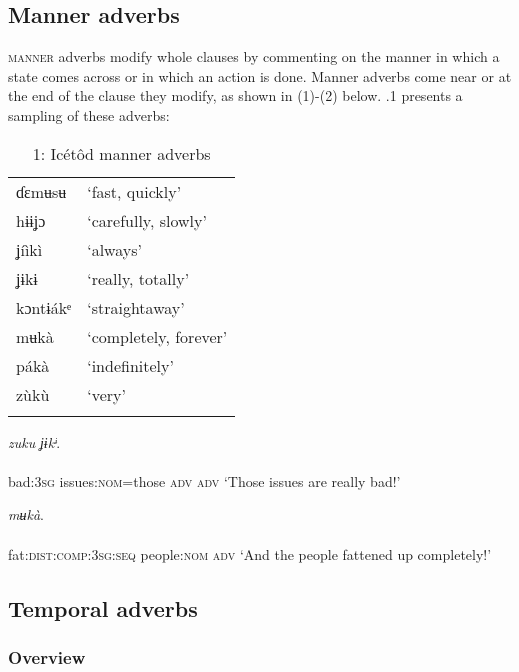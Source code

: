 \subsection{Manner adverbs}


\textsc{manner} adverbs modify whole clauses by commenting on the manner in which a state comes across or in which an action is done. Manner adverbs come near or at the end of the clause they modify, as shown in (1)-(2) below. .1 presents a sampling of these adverbs:


\begin{table}
\caption{1: Icétôd manner adverbs}
\label{tab:9}


\begin{tabularx}{\textwidth}{XX}
\lsptoprule

ɗɛmʉsʉ & ‘fast, quickly’\\
hɨɨʝɔ & ‘carefully, slowly’\\
ʝíìkì & ‘always’\\
ʝɨkɨ & ‘really, totally’\\
kɔntɨákᵉ & ‘straightaway’\\
mʉkà & ‘completely, forever’\\
pákà & ‘indefinitely’\\
zùkù & ‘very’\\
\lspbottomrule
\end{tabularx}
\end{table}



\ea\label{ex:}
     \textit{zuku}\textit{}   \textit{ʝɨkᶤ}. \\
    \\
bad:\textsc{3sg}   issues:\textsc{nom}=those   \textsc{adv   adv}
\glt ‘Those issues are really bad!’ 
\z




\ea\label{ex:}
     \textit{mʉkà}. \\
    \\
fat:\textsc{dist:comp:3sg:seq}   people:\textsc{nom}   \textsc{adv}
\glt ‘And the people fattened up completely!’ 
\z






\subsection{Temporal adverbs}
\subsubsection{Overview}

